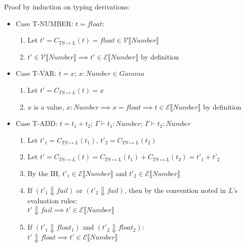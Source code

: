 \documentclass{article}
\newcommand{\denoteset}[2]{\mathcal{#1} \llbracket #2 \rrbracket}
\begin{document}
	Proof by induction on typing derivations:
	
	\begin{itemize}
		\item Case T-NUMBER: $t = float$:
		\begin{enumerate}
			\item Let $t' = C_{TS \mapsto L}(t) = float \in \denoteset{V}{Number}$
			\item $t' \in \denoteset{V}{Number} \implies t' \in \denoteset{E}{Number}$ by definition
		\end{enumerate}
		
		\item Case T-VAR: $t = x$; $x: Number \in Gamma$
		\begin{enumerate}
			\item Let $t' = C_{TS \mapsto L}(t) = x$
			\item $x$ is a value, $x: Number \implies x = float \implies t \in \denoteset{E}{Number}$ by definition
		\end{enumerate}
	
		\item Case T-ADD: $t = t_1 + t_2$; $\Gamma \vdash t_1: Number$; $\Gamma \vdash t_2: Number$
		\begin{enumerate}
			\item Let $t'_1 = C_{TS \mapsto L}(t_1)$, $t'_2 = C_{TS \mapsto L}(t_2)$
			\item Let $t' = C_{TS \mapsto L}(t) = C_{TS \mapsto L}(t_1) + C_{TS \mapsto L}(t_2) = t'_1 + t'_2$
			\item By the IH, $t'_1 \in \denoteset{E}{Number}$ and $t'_2 \in \denoteset{E}{Number}$
			\item If $(t'_1 \Downarrow fail)$ or $(t'_2 \Downarrow fail)$, then by the convention noted in $L$'s evaluation rules:\\
				$t' \Downarrow fail \implies t' \in \denoteset{E}{Number}$
			\item If $(t'_1 \Downarrow float_1)$ and $(t'_2 \Downarrow float_2)$:\\
				$t' \Downarrow float \implies t' \in \denoteset{E}{Number}$
		\end{enumerate}
	

\end{itemize}
\end{document}
